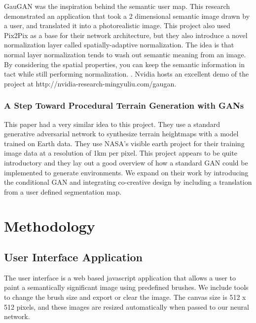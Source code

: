 \documentclass[twocolumn]{article}
\begin{document}
	GauGAN was the inspiration behind the semantic user map. This research demonstrated an application that took a 2 dimensional semantic image drawn by a user, and translated it into a photorealistic image. This project also used Pix2Pix as a base for their network architecture, but they also introduce a novel normalization layer called spatially-adaptive normalization. The idea is that normal layer normalization tends to wash out semantic meaning from an image. By considering the spatial properties, you can keep the semantic information in tact while still performing normalization. \cite{park2019semantic}	. Nvidia hosts an excellent demo of the project at http://nvidia-research-mingyuliu.com/gaugan.
	
	
	\subsubsection{A Step Toward Procedural Terrain Generation with GANs}
	
	This paper had a very similar idea to this project. They use a standard generative adversarial network to synthesize terrain heightmaps with a model trained on Earth data. They use NASA's visible earth project for their training image data at a resolution of 1km per pixel. This project appears to be quite introductory and they lay out a good overview of how a standard GAN could be implemented to generate environments. We expand on their work by introducing the conditional GAN and integrating co-creative design by including a translation from a user defined segmentation map. \cite{beckham2017step}
		
	\section{Methodology}
		
	\subsection{User Interface Application}
	
	The user interface is a web based javascript application that allows a user to paint a semantically significant image using predefined brushes. We include tools to change the brush size and export or clear the image. The canvas size is 512 x 512 pixels, and these images are resized automatically when passed to our neural network.
\end{document}
